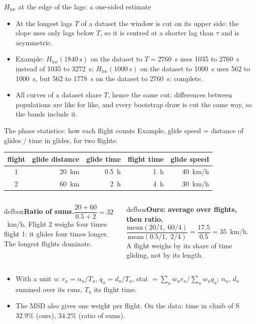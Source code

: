 \documentclass[11pt,aspectratio=169]{beamer}
\newcommand{\Sl}{\mathrm{S}}
\newcommand{\Hloc}{H_{\mathrm{loc}}}
\newcommand{\defn}[2]{%
  \begin{beamercolorbox}[wd=\linewidth,sep=5pt]{defbox}\small\textcolor{steel}{\textbf{#1.}}\enspace #2\end{beamercolorbox}}
\newcommand{\tikzfig}[2][0.8\textheight]{%
  \begin{center}\adjustbox{max width=\linewidth,max height=#1}{}\end{center}}
\begin{document}
\begin{frame}[label=app-hlocedge]{$\Hloc$ at the edge of the lags: a one-sided estimate}
\tikzfig[0.32\textheight]{edge}
\begin{itemize}
  \item At the longest lags $T$ of a dataset the window is cut on its upper side: the slope uses only lags below $T$, so it is centred at a shorter lag than $\tau$ and is asymmetric.
  \item Example: $\Hloc(1840~\mathrm{s})$ on the dataset to $T=2760$~s uses 1035 to 2760~s instead of 1035 to 3272~s; $\Hloc(1000~\mathrm{s})$ on the dataset to 1000~s uses 562 to 1000~s, but 562 to 1778~s on the dataset to 2760~s: complete.
  \item All curves of a dataset share $T$, hence the same cut: differences between populations are like for like, and every bootstrap draw is cut the same way, so the bands include it.
\end{itemize}
\end{frame}


\begin{frame}[label=app-estimator]{The phase statistics: how each flight counts}
Example, glide speed = distance of glides / time in glides, for two flights:
\begin{center}\small
\begin{tabular}{@{}c r r r r@{}}
\toprule
flight & glide distance & glide time & flight time & glide speed \\
\midrule
1 & 20~km & 0.5~h & 1~h & 40~km/h \\
2 & 60~km & 2~h & 4~h & 30~km/h \\
\bottomrule
\end{tabular}
\end{center}
\begin{columns}[T,onlytextwidth]
\defn{Ratio of sums}{$\dfrac{20+60}{0.5+2}=32$~km/h. Flight 2 weighs four times flight 1: it glides four times longer. The longest flights dominate.}
\defn{Ours: average over flights, then ratio}{$\dfrac{\mathrm{mean}(20/1,\;60/4)}{\mathrm{mean}(0.5/1,\;2/4)}=\dfrac{17.5}{0.5}=35$~km/h. A flight weighs by its share of time gliding, not by its length.}
\end{columns}
\vspace{1mm}
\begin{itemize}
  \item With a unit $u$: $r_u=n_u/T_u$, $q_u=d_u/T_u$, stat $=\sum_u w_u r_u\big/\sum_u w_u q_u$; $n_u$, $d_u$ summed over its runs, $T_u$ its flight time.
  \item The MSD also gives one weight per flight. On the data: time in climb of $\Sl$ 32.9\% (ours), 34.2\% (ratio of sums).
\end{itemize}
\end{frame}
\end{document}
